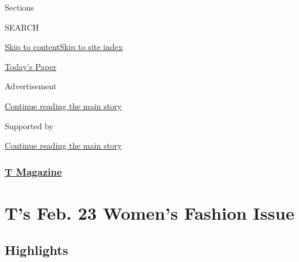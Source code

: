 Sections

SEARCH

\protect\hyperlink{site-content}{Skip to
content}\protect\hyperlink{site-index}{Skip to site index}

\href{https://myaccount.nytimes.com/auth/login?response_type=cookie\&client_id=vi}{}

\href{https://www.nytimes.com/section/todayspaper}{Today's Paper}

Advertisement

\protect\hyperlink{after-top}{Continue reading the main story}

Supported by

\protect\hyperlink{after-sponsor}{Continue reading the main story}

\hypertarget{t-magazine}{%
\subsubsection{\texorpdfstring{\href{/section/t-magazine}{T
Magazine}}{T Magazine}}\label{t-magazine}}

\hypertarget{ts-feb-23-womens-fashion-issue}{%
\section{T's Feb. 23 Women's Fashion
Issue}\label{ts-feb-23-womens-fashion-issue}}

\hypertarget{highlights}{%
\subsection{Highlights}\label{highlights}}


